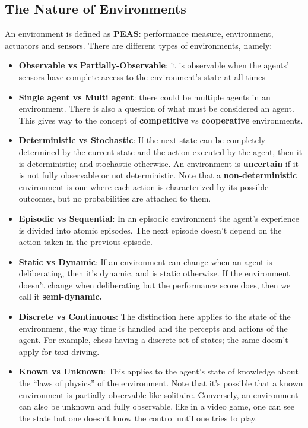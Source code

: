 \documentclass[twoside]{article}
\begin{document}
\subsection{The Nature of Environments}
An environment is defined as \textbf{PEAS}: performance measure, environment,
actuators and sensors. There are different types of environments, namely:
\begin{itemize}
\item \textbf{Observable vs Partially-Observable}: it is observable when the agents'
        sensors have complete access to the environment's state at all times
\item \textbf{Single agent vs Multi agent}: there could be multiple agents in
        an environment. There is also a question of what must be considered an
        agent. This gives way to the concept of \textbf{competitive} vs
        \textbf{cooperative} environments.
\item \textbf{Deterministic vs Stochastic}: If the next state can be completely
        determined by the current state and the action executed by the agent,
        then it is deterministic; and stochastic otherwise. An environment
        is \textbf{uncertain} if it is not fully observable or not deterministic.
        Note that a \textbf{non-deterministic} environment is one where each
        action is characterized by its possible outcomes, but no probabilities
        are attached to them.
\item \textbf{Episodic vs Sequential}: In an episodic environment the agent's
        experience is divided into atomic episodes. The next episode doesn't
        depend on the action taken in the previous episode.
\item \textbf{Static vs Dynamic}: If an environment can change when an agent
        is deliberating, then it's dynamic, and is static otherwise. If the
        environment doesn't change when deliberating but the performance score
        does, then we call it \textbf{semi-dynamic.}
\item \textbf{Discrete vs Continuous}: The distinction here applies to the state
        of the environment, the way time is handled and the percepts and actions
        of the agent. For example, chess having a discrete set of states; the
        same doesn't apply for taxi driving.
\item \textbf{Known vs Unknown}: This applies to the agent's state of knowledge
        about the ``laws of physics'' of the environment. Note that it's 
        possible that a known environment is partially observable like solitaire.
        Conversely, an environment can also be unknown and fully observable,
        like in a video game, one can see the state but one doesn't know the
        control until one tries to play.
\end{itemize}
\end{document}
